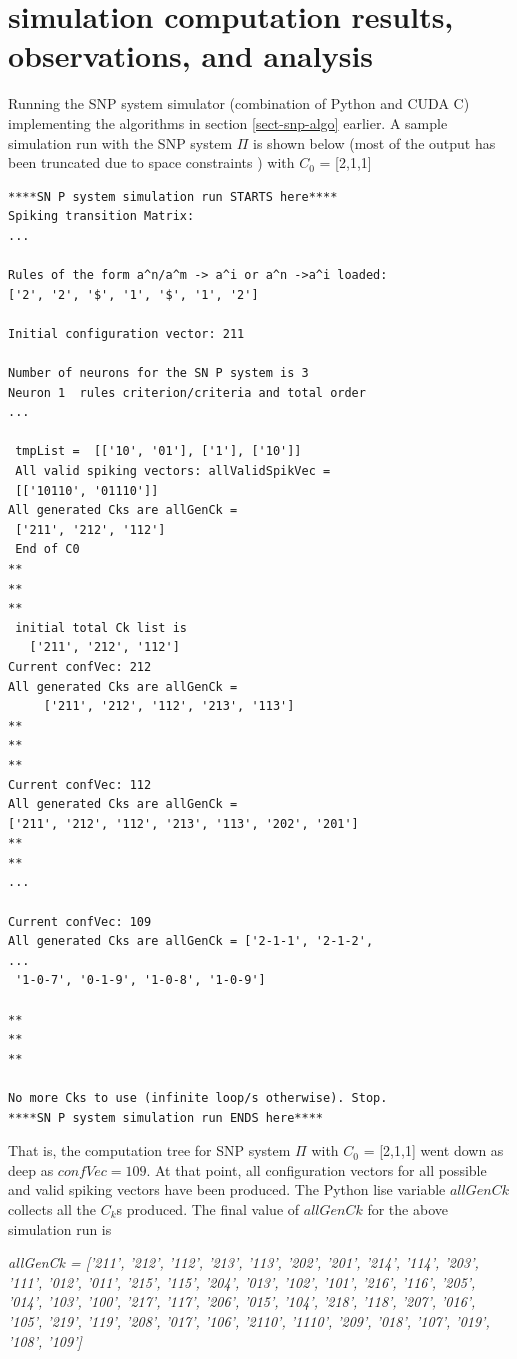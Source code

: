 \documentclass{acm_proc_article-sp}
\begin{document}
\section{simulation computation results, observations, and analysis}
Running the SNP system simulator (combination of Python
and CUDA C) implementing the algorithms in section \ref{sect-snp-algo}
earlier. A sample simulation run with the SNP system $\Pi$ is
shown below (most of the output has been truncated due to space constraints ) with $C_0$ = [2,1,1]
\begin{verbatim}
****SN P system simulation run STARTS here****
Spiking transition Matrix: 
... 

Rules of the form a^n/a^m -> a^i or a^n ->a^i loaded: 
['2', '2', '$', '1', '$', '1', '2'] 

Initial configuration vector: 211
 
Number of neurons for the SN P system is 3 
Neuron 1  rules criterion/criteria and total order 
... 

 tmpList =  [['10', '01'], ['1'], ['10']] 
 All valid spiking vectors: allValidSpikVec =
 [['10110', '01110']] 
All generated Cks are allGenCk =
 ['211', '212', '112'] 
 End of C0 
** 
** 
** 
 initial total Ck list is
   ['211', '212', '112'] 
Current confVec: 212 
All generated Cks are allGenCk =
	 ['211', '212', '112', '213', '113'] 
** 
** 
** 
Current confVec: 112 
All generated Cks are allGenCk =
['211', '212', '112', '213', '113', '202', '201'] 
** 
** 
...

Current confVec: 109
All generated Cks are allGenCk = ['2-1-1', '2-1-2',
...
 '1-0-7', '0-1-9', '1-0-8', '1-0-9']

**
**
**

No more Cks to use (infinite loop/s otherwise). Stop.
****SN P system simulation run ENDS here****
\end{verbatim}

That is, the computation tree for SNP system $\Pi$ with $C_0$ = [2,1,1] went down as deep as $confVec = 109$. At that point, all configuration vectors for all possible and valid spiking vectors have been produced. The Python lise variable $allGenCk$ collects all the $C_k$s produced. The final value of $allGenCk$ for the above simulation run is

\textit{allGenCk = ['211', '212', '112', '213', '113', '202', '201', '214',
'114', '203', '111', '012', '011', '215', '115', '204', '013', '102',
'101', '216', '116', '205', '014', '103', '100', '217', '117', '206',
'015', '104', '218', '118', '207', '016', '105', '219', '119', '208',
'017', '106', '2110', '1110', '209', '018', '107', '019', '108', '109'] }
\end{document}
